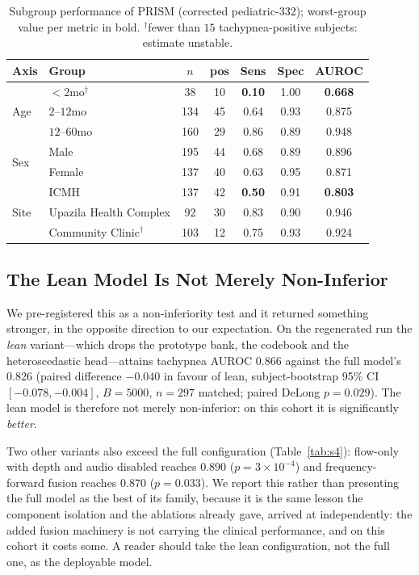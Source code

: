 \begin{table}[!t]\centering\small
\caption{Subgroup performance of PRISM (corrected pediatric-332); worst-group value per metric in bold.
$^{\dagger}$fewer than $15$ tachypnea-positive subjects: estimate unstable.}
\label{tab:fairness}
\begin{tabular}{@{}llccccc@{}}
\toprule
Axis & Group & $n$ & pos & Sens & Spec & AUROC\\
\midrule
\multirow{3}{*}{Age}
 & $<2$mo$^{\dagger}$   & 38  & 10 & \textbf{0.10} & 1.00 & \textbf{0.668}\\
 & $2$--$12$mo          & 134 & 45 & 0.64 & 0.93 & 0.875\\
 & $12$--$60$mo         & 160 & 29 & 0.86 & 0.89 & 0.948\\
\midrule
\multirow{2}{*}{Sex}
 & Male   & 195 & 44 & 0.68 & 0.89 & 0.896\\
 & Female & 137 & 40 & 0.63 & 0.95 & 0.871\\
\midrule
\multirow{3}{*}{Site}
 & ICMH                    & 137 & 42 & \textbf{0.50} & 0.91 & \textbf{0.803}\\
 & Upazila Health Complex  & 92  & 30 & 0.83 & 0.90 & 0.946\\
 & Community Clinic$^{\dagger}$ & 103 & 12 & 0.75 & 0.93 & 0.924\\
\bottomrule
\end{tabular}
\end{table}

\subsection{The Lean Model Is Not Merely Non-Inferior}
We pre-registered this as a non-inferiority test and it returned something stronger, in the opposite
direction to our expectation. On the regenerated run the \emph{lean} variant---which drops the prototype
bank, the codebook and the heteroscedastic head---attains tachypnea AUROC $0.866$ against the full
model's $0.826$ (paired difference $-0.040$ in favour of lean, subject-bootstrap 95\% CI
$[-0.078,-0.004]$, $B{=}5000$, $n{=}297$ matched; paired DeLong $p=0.029$). The lean model is therefore
not merely non-inferior: on this cohort it is significantly \emph{better}.

Two other variants also exceed the full configuration (Table~\ref{tab:s4}): flow-only with depth and
audio disabled reaches $0.890$ ($p=3{\times}10^{-4}$) and frequency-forward fusion reaches $0.870$
($p=0.033$). We report this rather than presenting the full model as the best of its family, because it
is the same lesson the component isolation and the ablations already gave, arrived at independently:
the added fusion machinery is not carrying the clinical performance, and on this cohort it costs some.
A reader should take the lean configuration, not the full one, as the deployable model.

